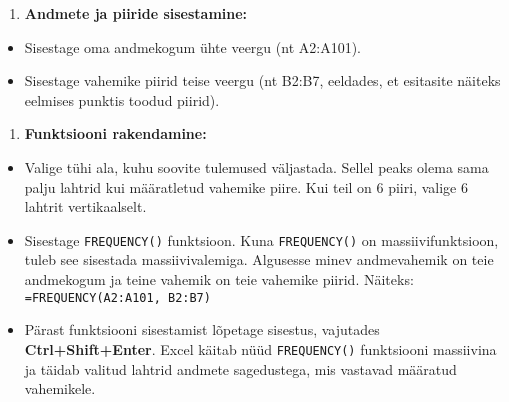 \documentclass[
]{article}
\providecommand{\tightlist}{%
  \setlength{\itemsep}{0pt}\setlength{\parskip}{0pt}}
\begin{document}
\begin{enumerate}
\def\labelenumi{\arabic{enumi}.}
\tightlist
\item
  \textbf{Andmete ja piiride sisestamine:}
\end{enumerate}

\begin{itemize}
\tightlist
\item
  Sisestage oma andmekogum ühte veergu (nt A2:A101).
\item
  Sisestage vahemike piirid teise veergu (nt B2:B7, eeldades, et
  esitasite näiteks eelmises punktis toodud piirid).
\end{itemize}

\begin{enumerate}
\def\labelenumi{\arabic{enumi}.}
\setcounter{enumi}{1}
\tightlist
\item
  \textbf{Funktsiooni rakendamine:}
\end{enumerate}

\begin{itemize}
\tightlist
\item
  Valige tühi ala, kuhu soovite tulemused väljastada. Sellel peaks olema
  sama palju lahtrid kui määratletud vahemike piire. Kui teil on 6
  piiri, valige 6 lahtrit vertikaalselt.
\item
  Sisestage \texttt{FREQUENCY()} funktsioon. Kuna \texttt{FREQUENCY()}
  on massiivifunktsioon, tuleb see sisestada massiivivalemiga. Algusesse
  minev andmevahemik on teie andmekogum ja teine vahemik on teie
  vahemike piirid. Näiteks: \texttt{=FREQUENCY(A2:A101,\ B2:B7)}
\item
  Pärast funktsiooni sisestamist lõpetage sisestus, vajutades
  \textbf{Ctrl+Shift+Enter}. Excel käitab nüüd \texttt{FREQUENCY()}
  funktsiooni massiivina ja täidab valitud lahtrid andmete sagedustega,
  mis vastavad määratud vahemikele.
\end{itemize}
\end{document}
